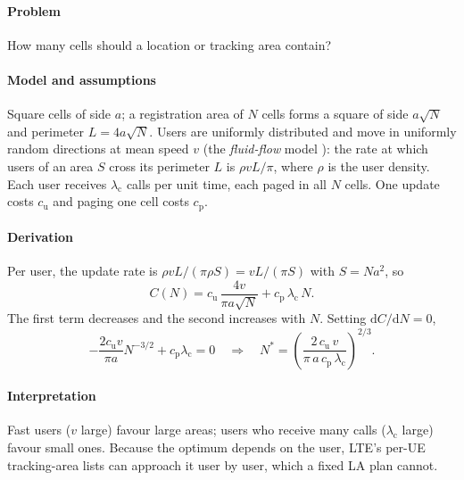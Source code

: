 \documentclass[11pt,a4paper]{article}
\begin{document}
\paragraph{Problem} How many cells should a location or tracking area contain?
\paragraph{Model and assumptions} Square cells of side $a$; a registration area of $N$ cells
forms a square of side $a\sqrt{N}$ and perimeter $L = 4a\sqrt{N}$. Users are uniformly distributed
and move in uniformly random directions at mean speed $v$ (the \emph{fluid-flow} model
\cite{akyildiz1999mobility}): the rate at which users of an area $S$ cross its perimeter $L$ is
$\rho vL/\pi$, where $\rho$ is the user density. Each user receives $\lambda_\mathrm{c}$ calls per
unit time, each paged in all $N$ cells. One update costs $c_\mathrm{u}$ and paging one cell costs
$c_\mathrm{p}$.
\paragraph{Derivation} Per user, the update rate is $\rho vL/(\pi\rho S) = vL/(\pi S)$ with
$S = Na^2$, so
\begin{equation}\label{eq:cost}
  C(N) = c_\mathrm{u}\,\frac{4v}{\pi a\sqrt{N}} + c_\mathrm{p}\,\lambda_\mathrm{c}\,N .
\end{equation}
The first term decreases and the second increases with $N$. Setting $\mathrm{d}C/\mathrm{d}N = 0$,
\begin{equation}\label{eq:nopt}
  -\frac{2c_\mathrm{u}v}{\pi a}N^{-3/2} + c_\mathrm{p}\lambda_\mathrm{c} = 0
  \quad\Longrightarrow\quad
  N^\ast = \left(\frac{2\,c_\mathrm{u}\,v}{\pi\,a\,c_\mathrm{p}\,\lambda_\mathrm{c}}\right)^{2/3}.
\end{equation}
\paragraph{Interpretation} Fast users ($v$ large) favour large areas; users who receive many calls
($\lambda_\mathrm{c}$ large) favour small ones. Because the optimum depends on the user, LTE's
per-UE tracking-area lists can approach it user by user, which a fixed LA plan cannot.

\begin{acnfigure}
  \caption{Update, paging and total signalling cost of \cref{eq:cost} for
  $c_\mathrm{u} = 1$, $c_\mathrm{p} = 0.1$, $v = \qty{10}{\metre\per\second}$, $a = \qty{500}{\metre}$,
  $\lambda_\mathrm{c} = 2$ calls per hour (\cref{ex:la}).}
  \label{fig:lacost}
\end{acnfigure}
\end{document}
